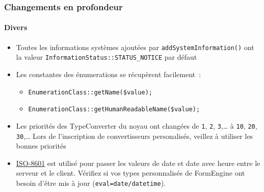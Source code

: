 \begin{frame}[fragile]
	\frametitle{Changements en profondeur}
	\framesubtitle{Divers}


	\begin{itemize}
		\item Toutes les informations systèmes ajoutées par \texttt{addSystemInformation()}
		 	ont la valeur \texttt{InformationStatus::STATUS\_NOTICE} par défaut
		\item Les constantes des énumerations se récupèrent facilement~:

			\begin{itemize}
				\item \texttt{EnumerationClass::getName(\$value);}
				\item \texttt{EnumerationClass::getHumanReadableName(\$value);}
			\end{itemize}

		\item Les priorités des TypeConverter du noyau ont changées de\newline
			\texttt{1}, \texttt{2}, \texttt{3},… à \texttt{10}, \texttt{20}, \texttt{30},…
			Lors de l'inscription de convertisseurs personalisés, veillez à utiliser les
			bonnes priorités

		\item \href{https://en.wikipedia.org/wiki/ISO_8601}{ISO-8601} est utilisé pour passer les
			valeurs de date et date avec heure entre le serveur et le client. Vérifiez si vos types
			personnalisés de FormEngine ont besoin d'être mis à jour (\texttt{eval=date/datetime}).

	\end{itemize}

\end{frame}












